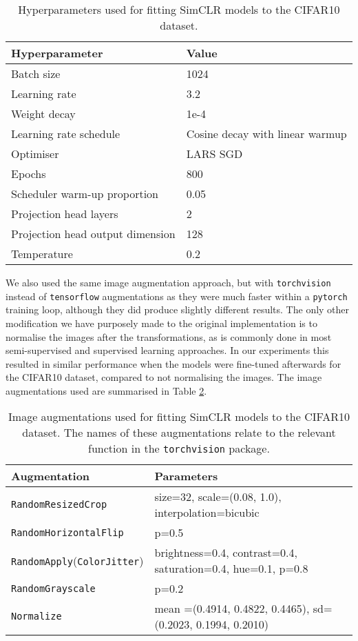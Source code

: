 \documentclass{article}
\begin{document}
\begin{table}[H]
\centering
\caption{Hyperparameters used for fitting SimCLR models to the CIFAR10 dataset.}
\label{tbl:simclr_cifar10_hyperparameters}
 \begin{tabular}{m{6cm} | m{6cm}} 
 \hline
 Hyperparameter & Value \\
 \hline
 Batch size & 1024 \\
 Learning rate & 3.2 \\ 
 Weight decay & 1e-4 \\
 Learning rate schedule &  Cosine decay with linear warmup \\
 Optimiser & LARS SGD \\
 Epochs & 800 \\
 Scheduler warm-up proportion & 0.05 \\
 Projection head layers & 2  \\
 Projection head output dimension & 128  \\
 Temperature & 0.2 \\
 \hline
 \end{tabular}
\end{table}

We also used the same image augmentation approach, but with \texttt{torchvision} instead of \texttt{tensorflow} augmentations as they were much faster within a \texttt{pytorch} training loop, although they did produce slightly different results. The only other modification we have purposely made to the original implementation is to normalise the images after the transformations, as is commonly done in most semi-supervised and supervised learning approaches. In our experiments this resulted in similar performance when the models were fine-tuned afterwards for the CIFAR10 dataset, compared to not normalising the images. The image augmentations used are summarised in Table \ref{tbl:simclr_cifar10_augmentations}.

\begin{table}[H]
\centering
\caption{Image augmentations used for fitting SimCLR models to the CIFAR10 dataset. The names of these augmentations relate to the relevant function in the \texttt{torchvision} package.}
\label{tbl:simclr_cifar10_augmentations}
 \begin{tabular}{m{6cm} m{6cm}} 
 \hline
 Augmentation & Parameters \\
 \hline
 \texttt{RandomResizedCrop} & size=32, scale=(0.08, 1.0), interpolation=bicubic \\
 \hline
 \texttt{RandomHorizontalFlip} & p=0.5 \\ 
 \hline
 \texttt{RandomApply}(\texttt{ColorJitter}) & brightness=0.4, contrast=0.4, saturation=0.4, hue=0.1, p=0.8 \\
 \hline
 \texttt{RandomGrayscale} & p=0.2 \\
 \hline
 \texttt{Normalize} & mean =(0.4914, 0.4822, 0.4465), sd=(0.2023, 0.1994, 0.2010) \\
 \hline
 \end{tabular}
\end{table}
\end{document}

